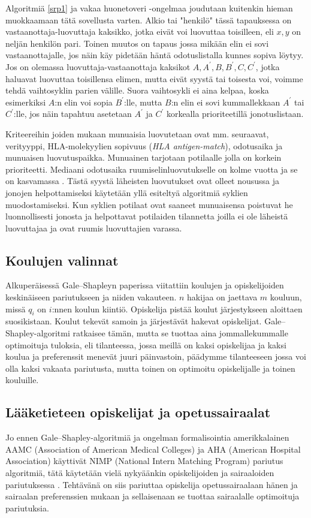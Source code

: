 \documentclass[finnish]{tktltiki2}
\theoremstyle{definition}
\theoremstyle{remark}
\begin{document}
Algoritmiä \ref{srp1} ja vakaa huonetoveri -ongelmaa joudutaan kuitenkin hieman muokkaamaan tätä sovellusta varten. Alkio tai "henkilö" tässä tapauksessa on vastaanottaja-luovuttaja kaksikko, jotka eivät voi luovuttaa toisilleen, eli ${x, y}$ on neljän henkilön pari. Toinen muutos on tapaus jossa mikään elin ei sovi vastaanottajalle, jos näin käy pidetään häntä odotuslistalla kunnes sopiva löytyy. Jos on olemassa luovuttaja-vastaanottaja kaksikot ${A, A^{'}}, {B, B^{'}}, {C, C^{'}}$, jotka haluavat luovuttaa toisillensa elimen, mutta eivät syystä tai toisesta voi, voimme tehdä vaihtosyklin parien välille. Suora vaihtosykli ei aina kelpaa, koska esimerkiksi $A$:n elin voi sopia $B^{'}$:lle, mutta $B$:n elin ei sovi kummallekkaan $A^{'}$ tai $C^{'}$:lle, jos näin tapahtuu asetetaan $A^{'}$ ja $C^{'}$ korkealla prioriteetillä jonotuslistaan.

Kriteereihin joiden mukaan munuaisia luovutetaan ovat mm. seuraavat, verityyppi, HLA-molekyylien sopivuus (\emph{HLA antigen-match}), odotusaika ja munuaisen luovutuspaikka. Munuainen tarjotaan potilaalle jolla on korkein prioriteetti. Mediaani odotusaika ruumiselinluovutukselle on kolme vuotta ja se on kasvamassa \cite[s. 7]{NBERw10002}. Tästä syystä läheisten luovutukset ovat olleet nousussa ja jonojen helpottamiseksi käytetään yllä esiteltyä algoritmiä syklien muodostamiseksi. Kun syklien potilaat ovat saaneet munuaisensa poistuvat he luonnollisesti jonosta ja helpottavat potilaiden tilannetta joilla ei ole läheistä luovuttajaa ja ovat ruumis luovuttajien varassa.


\subsection{Koulujen valinnat}
Alkuperäisessä Gale--Shapleyn paperissa \cite{gale62a} viitattiin koulujen ja opiskelijoiden keskinäiseen pariutukseen ja niiden vakauteen. $n$ hakijaa on jaettava $m$ kouluun, missä $q_{i}$ on $i$:nnen koulun kiintiö. Opiskelija pistää koulut järjestykseen aloittaen suosikistaan. Koulut tekevät samoin ja järjestävät hakevat opiskelijat. Gale--Shapley-algoritmi ratkaisee tämän, mutta se tuottaa aina jommallekummalle optimoituja tuloksia, eli tilanteessa, jossa meillä on kaksi opiskelijaa ja kaksi koulua ja preferenssit menevät juuri päinvastoin, päädymme tilanteeseen jossa voi olla kaksi vakaata pariutusta, mutta toinen on optimoitu opiskelijalle ja toinen kouluille.

\subsection{Lääketieteen opiskelijat ja opetussairaalat}
Jo ennen Gale--Shapley-algoritmiä ja ongelman formalisointia amerikkalainen AAMC (Association of American Medical Colleges) ja AHA (American Hospital Association) käyttivät NIMP (National Intern Matching Program) pariutus algoritmiä, tätä käytetään vielä nykyäänkin opiskelijoiden ja sairaaloiden pariutuksessa \cite{roth84}. Tehtävänä on siis pariuttaa opiskelija opetussairaalaan hänen ja sairaalan preferenssien mukaan ja sellaisenaan se tuottaa sairaalalle optimoituja pariutuksia.
\end{document}
